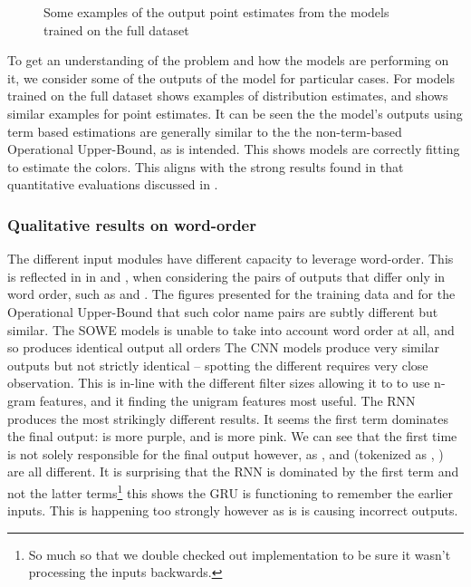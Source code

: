 \documentclass[11pt,a4paper]{article}
\begin{document}
\begin{figure}
	\caption{Some examples of the output point estimates from the models trained on the full dataset} \label{fig:pointout}
\end{figure}


To get an understanding of the problem and how the models are performing on it, we consider some of the outputs of the model for particular cases.
For models trained on the full dataset  shows examples of distribution estimates, and 
 shows similar examples for point estimates.
It can be seen the the model's outputs using term based estimations are generally similar to the the non-term-based Operational Upper-Bound, as is intended.
This shows models are correctly fitting to estimate the colors.
This aligns with the strong results found in that quantitative evaluations discussed in .

\subsubsection{Qualitative results on word-order}
The different input modules have different capacity to leverage word-order.
This is reflected in in  and ,
when considering the pairs of outputs that differ only in word order, such as  and .
The figures presented for the training data and for the Operational Upper-Bound that such color name pairs are subtly different but similar.
The SOWE models is unable to take into account word order at all, and so produces identical output all orders
The CNN models produce very similar outputs but not strictly identical -- spotting the different requires very close observation.
This is in-line with the different filter sizes allowing it to to use n-gram features, and it finding the unigram features most useful.
The RNN produces the most strikingly different results.
It seems the first term dominates the final output:  is more purple, and   is more pink.
We can see that the first time is not solely responsible for the final output however, as ,  and  (tokenized as , ) are all different.
It is surprising that the RNN is dominated by the first term and not the latter terms\footnote{So much so that we double checked out implementation to be sure it wasn't processing the inputs backwards.} this shows the GRU is functioning to remember the earlier inputs.
This is happening too strongly however as is is causing incorrect outputs.
\end{document}
